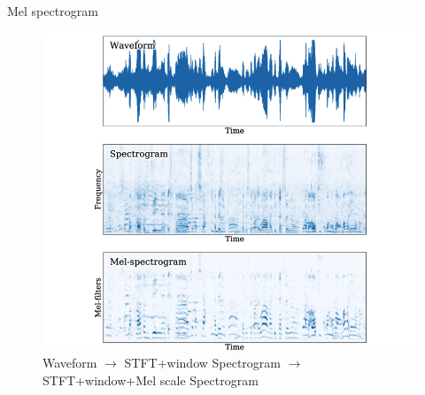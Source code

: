 \begin{frame}{Mel spectrogram}
	\begin{figure}
		\centering
		\includegraphics[width=0.8\linewidth]{figs/mel_spectrogram.png}
		\caption{Waveform $\rightarrow$ STFT+window Spectrogram $\rightarrow$ STFT+window+Mel scale Spectrogram}
	\end{figure}
\end{frame}

 